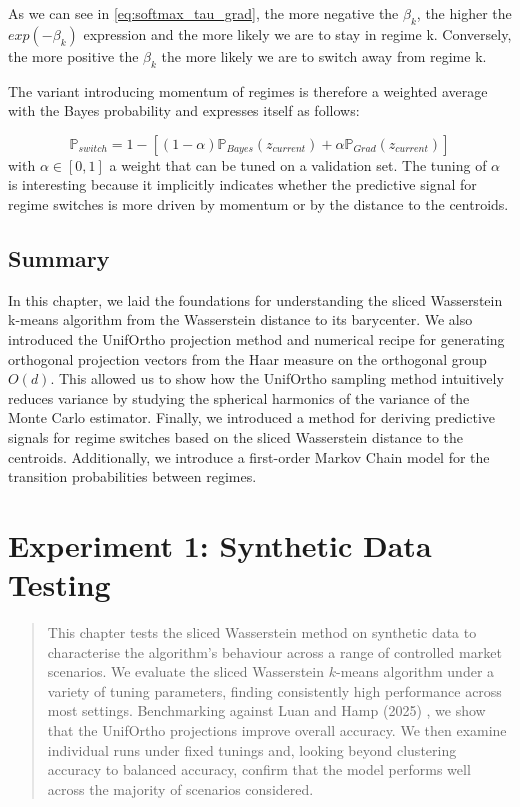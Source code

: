 \documentclass[12pt,a4paper]{report}
\begin{document}
As we can see in \ref{eq:softmax_tau_grad}, the more negative the $\beta_k$, the higher the $exp(-\beta_k)$ expression and the more likely we are to stay in regime k.
Conversely, the more positive the $\beta_k$ the more likely we are to switch away from regime k.

The variant introducing momentum of regimes is therefore a weighted average with the Bayes probability and expresses itself as follows: 

\begin{equation}
  \mathbb{P}_{switch} = 1- \left[(1-\alpha)\mathbb{P}_{Bayes}(z_{current}) + \alpha \mathbb{P}_{Grad}(z_{current}) \right] \label{eq:proba_switch_formula}
\end{equation}
with $\alpha \in [0,1]$ a weight that can be tuned on a validation set.
The tuning of $\alpha$ is interesting because it implicitly indicates whether the predictive signal for regime switches is more driven by momentum or by the distance to the centroids. 

\section{Summary}
In this chapter, we laid the foundations for understanding the sliced Wasserstein k-means algorithm from the Wasserstein distance to its barycenter. 
We also introduced the UnifOrtho projection method and numerical recipe for generating orthogonal projection vectors from the Haar measure on the orthogonal group $O(d)$. This allowed us to 
show how the UnifOrtho sampling method intuitively reduces variance by studying the spherical harmonics of the variance of the Monte Carlo estimator. 
Finally, we introduced a method for deriving predictive signals for regime switches based on the sliced Wasserstein distance to the centroids.
Additionally, we introduce a first-order Markov Chain model for the transition probabilities between regimes.


\chapter{Experiment 1: Synthetic Data Testing} \label{section:synthetic_data}

\begin{quote}
This chapter tests the sliced Wasserstein method on synthetic data to characterise
the algorithm's behaviour across a range of controlled market scenarios. We evaluate
the sliced Wasserstein $k$-means algorithm under a variety of tuning parameters,
finding consistently high performance across most settings. Benchmarking against
Luan and Hamp (2025) \cite{LuanHamp2025}, we show that the UnifOrtho projections
improve overall accuracy. We then examine individual runs under fixed tunings and,
looking beyond clustering accuracy to balanced accuracy, confirm that the model
performs well across the majority of scenarios considered.
\end{quote}
\end{document}
